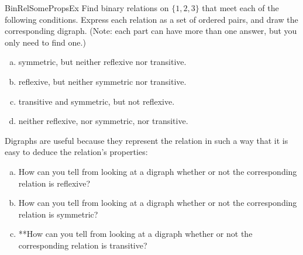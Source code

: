 \begin{exercise}{BinRelSomePropsEx}
Find binary relations on $\{1,2,3\}$ that meet each of the following conditions. Express each relation as a set of ordered pairs, and draw the corresponding digraph. (Note: each part can have more than one answer, but you only need to find one.)
\begin{enumerate}[(a)]
\item \label{BinRelSomePropsEx-symmonly}
symmetric, but neither reflexive nor transitive.
\item \label{BinRelSomePropsEx-refonly}
 reflexive, but neither symmetric nor transitive.
\item \label{BinRelSomePropsEx-transandsymm}
transitive and symmetric, but not reflexive.
\item \label{BinRelSomePropsEx-none}
neither reflexive, nor symmetric, nor transitive.
\end{enumerate}
\end{exercise}
Digraphs are useful because they represent the relation in such a way that it is easy to deduce the relation's properties: 

\begin{exercise}{21}
\begin{enumerate}[(a)]
\item
How can you tell from looking at a digraph whether or not the corresponding relation is reflexive?
\item
How can you tell from looking at a digraph whether or not the corresponding relation is symmetric? 
\item
**How can you tell from looking at a digraph whether or not the corresponding relation is transitive?
\end{enumerate}
\end{exercise}



